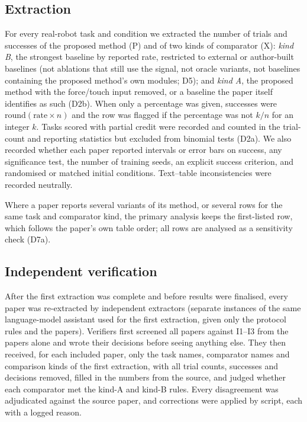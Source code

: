 \documentclass[11pt]{article}
\begin{document}
\subsection{Extraction}
For every real-robot task and condition we extracted the number of trials and successes of the proposed method (P) and of two kinds of comparator (X): \emph{kind B}, the strongest baseline by reported rate, restricted to external or author-built baselines (not ablations that still use the signal, not oracle variants, not baselines containing the proposed method's own modules; D5); and \emph{kind A}, the proposed method with the force/touch input removed, or a baseline the paper itself identifies as such (D2b). When only a percentage was given, successes were $\mathrm{round}(\text{rate}\times n)$ and the row was flagged if the percentage was not $k/n$ for an integer $k$. Tasks scored with partial credit were recorded and counted in the trial-count and reporting statistics but excluded from binomial tests (D2a). We also recorded whether each paper reported intervals or error bars on success, any significance test, the number of training seeds, an explicit success criterion, and randomised or matched initial conditions. Text--table inconsistencies were recorded neutrally.

Where a paper reports several variants of its method, or several rows for the same task and comparator kind, the primary analysis keeps the first-listed row, which follows the paper's own table order; all rows are analysed as a sensitivity check (D7a).

\subsection{Independent verification}\label{sec:verify-methods}
After the first extraction was complete and before results were finalised, every paper was re-extracted by independent extractors (separate instances of the same language-model assistant used for the first extraction, given only the protocol rules and the papers). Verifiers first screened all \VerScreened{} papers against I1--I3 from the papers alone and wrote their decisions before seeing anything else. They then received, for each included paper, only the task names, comparator names and comparison kinds of the first extraction, with all trial counts, successes and decisions removed, filled in the numbers from the source, and judged whether each comparator met the kind-A and kind-B rules. Every disagreement was adjudicated against the source paper, and corrections were applied by script, each with a logged reason.
\end{document}

